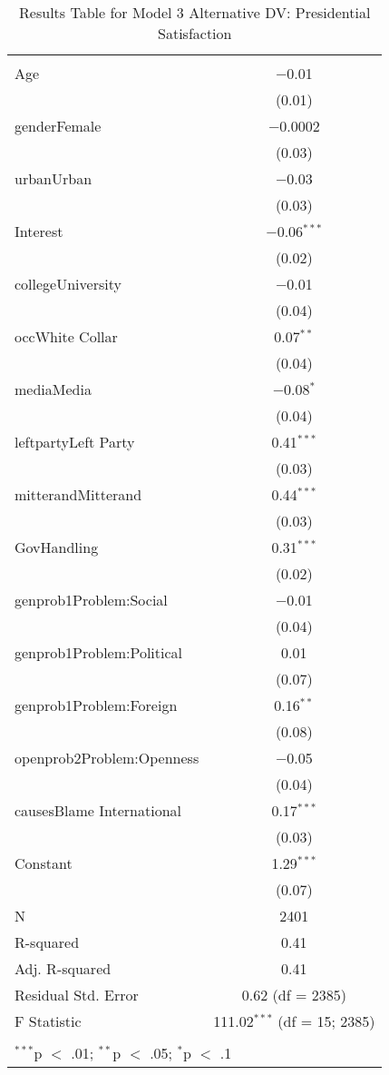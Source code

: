 
\begin{table}[!htbp] \centering 
  \caption{Results Table for Model 3 Alternative DV: Presidential Satisfaction} 
  \label{} 
\footnotesize 
\begin{tabular}{@{\extracolsep{5pt}}lc} 
\\[-1.8ex]\hline \\[-1.8ex] 
\hline \\[-1.8ex] 
 Age & $-$0.01 \\ 
  & (0.01) \\ 
  genderFemale & $-$0.0002 \\ 
  & (0.03) \\ 
  urbanUrban & $-$0.03 \\ 
  & (0.03) \\ 
  Interest & $-$0.06$^{***}$ \\ 
  & (0.02) \\ 
  collegeUniversity & $-$0.01 \\ 
  & (0.04) \\ 
  occWhite Collar & 0.07$^{**}$ \\ 
  & (0.04) \\ 
  mediaMedia & $-$0.08$^{*}$ \\ 
  & (0.04) \\ 
  leftpartyLeft Party & 0.41$^{***}$ \\ 
  & (0.03) \\ 
  mitterandMitterand & 0.44$^{***}$ \\ 
  & (0.03) \\ 
  GovHandling & 0.31$^{***}$ \\ 
  & (0.02) \\ 
  genprob1Problem:Social & $-$0.01 \\ 
  & (0.04) \\ 
  genprob1Problem:Political & 0.01 \\ 
  & (0.07) \\ 
  genprob1Problem:Foreign & 0.16$^{**}$ \\ 
  & (0.08) \\ 
  openprob2Problem:Openness & $-$0.05 \\ 
  & (0.04) \\ 
  causesBlame International & 0.17$^{***}$ \\ 
  & (0.03) \\ 
  Constant & 1.29$^{***}$ \\ 
  & (0.07) \\ 
 N & 2401 \\ 
R-squared & 0.41 \\ 
Adj. R-squared & 0.41 \\ 
Residual Std. Error & 0.62 (df = 2385) \\ 
F Statistic & 111.02$^{***}$ (df = 15; 2385) \\ 
\hline \\[-1.8ex] 
\multicolumn{2}{l}{$^{***}$p $<$ .01; $^{**}$p $<$ .05; $^{*}$p $<$ .1} \\ 
\end{tabular} 
\end{table} 

